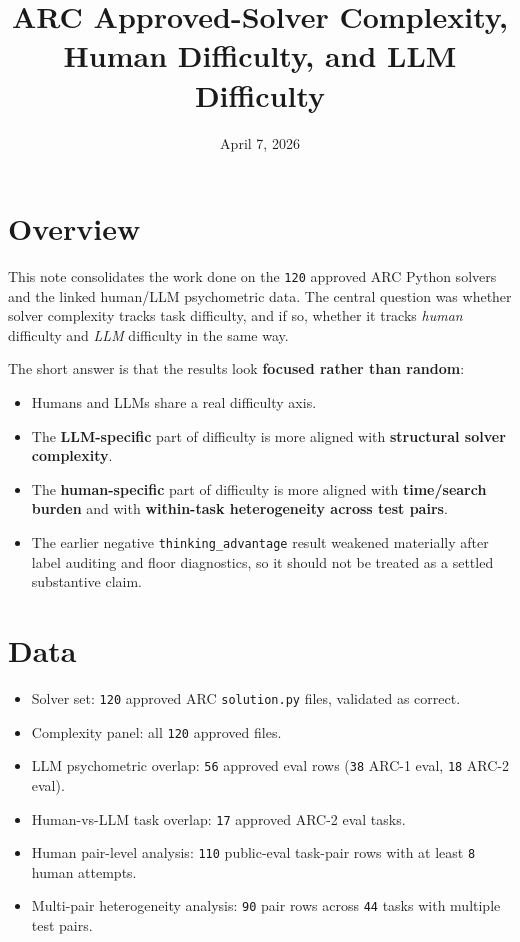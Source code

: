 \documentclass[11pt]{article}
\title{ARC Approved-Solver Complexity, Human Difficulty, and LLM Difficulty}
\author{}
\date{April 7, 2026}
\begin{document}
\maketitle

\section*{Overview}

This note consolidates the work done on the \texttt{120} approved ARC Python solvers and the linked human/LLM psychometric data. The central question was whether solver complexity tracks task difficulty, and if so, whether it tracks \emph{human} difficulty and \emph{LLM} difficulty in the same way.

The short answer is that the results look \textbf{focused rather than random}:

\begin{itemize}
  \item Humans and LLMs share a real difficulty axis.
  \item The \textbf{LLM-specific} part of difficulty is more aligned with \textbf{structural solver complexity}.
  \item The \textbf{human-specific} part of difficulty is more aligned with \textbf{time/search burden} and with \textbf{within-task heterogeneity across test pairs}.
  \item The earlier negative \texttt{thinking\_advantage} result weakened materially after label auditing and floor diagnostics, so it should not be treated as a settled substantive claim.
\end{itemize}

\section*{Data}

\begin{itemize}
  \item Solver set: \texttt{120} approved ARC \texttt{solution.py} files, validated as correct.
  \item Complexity panel: all \texttt{120} approved files.
  \item LLM psychometric overlap: \texttt{56} approved eval rows (\texttt{38} ARC-1 eval, \texttt{18} ARC-2 eval).
  \item Human-vs-LLM task overlap: \texttt{17} approved ARC-2 eval tasks.
  \item Human pair-level analysis: \texttt{110} public-eval task-pair rows with at least \texttt{8} human attempts.
  \item Multi-pair heterogeneity analysis: \texttt{90} pair rows across \texttt{44} tasks with multiple test pairs.
\end{itemize}
\end{document}
